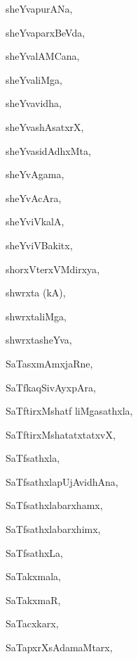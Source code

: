 \begin{multicols}{3}
{\noindent
{sheYvapurANa}, \pageref{sheYvapurANa}

\noindent
{sheYvaparxBeVda}, \pageref{sheYvaparxBeVda}

\noindent
{sheYvalAMCana}, \pageref{sheYvalAMCana}

\noindent
{sheYvaliMga}, \pageref{sheYvaliMga}

\noindent
{sheYvavidha}, \pageref{sheYvavidha}

\noindent
{sheYvashAsatxrX}, \pageref{sheYvashAsatxrX}

\noindent
{sheYvasidAdhxMta}, \pageref{sheYvasidAdhxMta}

\noindent
{sheYvAgama}, \pageref{sheYvAgama}

\noindent
{sheYvAcAra}, \pageref{sheYvAcAra}

\noindent
{sheYviVkalA}, \pageref{sheYviVkalA}

\noindent
{sheYviVBakitx}, \pageref{sheYviVBakitx}

\noindent
{shorxVterxVMdirxya}, \pageref{shorxVterxVMdirxya}

\noindent
{shwrxta (kA)}, \pageref{shwrxtakA}

\noindent
{shwrxtaliMga}, \pageref{shwrxtaliMga}

\noindent
{shwrxtasheYva}, \pageref{shwrxtasheYva}

\noindent
{SaTasxmAmxjaRne}, \pageref{SaTasxmAmxjaRne}

\noindent
{SaTfkaqSivAyxpAra}, \pageref{SaTfkaqSivAyxpAra}

\noindent
{SaTftirxMshatf liMgasathxla}, \pageref{SaTftirxMshatfliMgasathxla}

\noindent
{SaTftirxMshatatxtatxvX}, \pageref{SaTftirxMshatatxtatxvX}

\noindent
{SaTfsathxla}, \pageref{SaTfsathxla}

\noindent
{SaTfsathxlapUjAvidhAna}, \pageref{SaTfsathxlapUjAvidhAna}

\noindent
{SaTfsathxlabarxhamx}, \pageref{SaTfsathxlabarxhamx}

\noindent
{SaTfsathxlabarxhimx}, \pageref{SaTfsathxlabarxhimx}

\noindent
{SaTfsathxLa}, \pageref{SaTfsathxLa}

\noindent
{SaTakxmala}, \pageref{SaTakxmala}

\noindent
{SaTakxmaR}, \pageref{SaTakxmaR}

\noindent
{SaTacxkarx}, \pageref{SaTacxkarx}

\noindent
{SaTapxrXsAdamaMtarx}, \pageref{SaTapxrXsAdamaMtarx}

}
\end{multicols}
